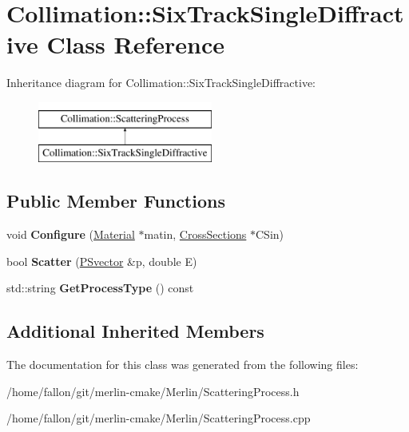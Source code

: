 \hypertarget{classCollimation_1_1SixTrackSingleDiffractive}{}\section{Collimation\+:\+:Six\+Track\+Single\+Diffractive Class Reference}
\label{classCollimation_1_1SixTrackSingleDiffractive}
Inheritance diagram for Collimation\+:\+:Six\+Track\+Single\+Diffractive\+:\begin{figure}[H]
\begin{center}
\leavevmode
\includegraphics[height=2.000000cm]{classCollimation_1_1SixTrackSingleDiffractive}
\end{center}
\end{figure}
\subsection*{Public Member Functions}
\begin{DoxyCompactItemize}
\item 
\mbox{\label{classCollimation_1_1SixTrackSingleDiffractive_ad7174449fdeb7436e4ff0ef48e3a96aa}} 
void {\bfseries Configure} (\hyperlink{classMaterial}{Material} $\ast$matin, \hyperlink{classCollimation_1_1CrossSections}{Cross\+Sections} $\ast$C\+Sin)
\item 
\mbox{\label{classCollimation_1_1SixTrackSingleDiffractive_a5d39ca2df5c5459b287a5412ba4c8e1e}} 
bool {\bfseries Scatter} (\hyperlink{classPSvector}{P\+Svector} \&p, double E)
\item 
\mbox{\label{classCollimation_1_1SixTrackSingleDiffractive_a6632785dde1ceca1184ad51cb7f0081a}} 
std\+::string {\bfseries Get\+Process\+Type} () const
\end{DoxyCompactItemize}
\subsection*{Additional Inherited Members}


The documentation for this class was generated from the following files\+:\begin{DoxyCompactItemize}
\item 
/home/fallon/git/merlin-\/cmake/\+Merlin/Scattering\+Process.\+h\item 
/home/fallon/git/merlin-\/cmake/\+Merlin/Scattering\+Process.\+cpp\end{DoxyCompactItemize}
